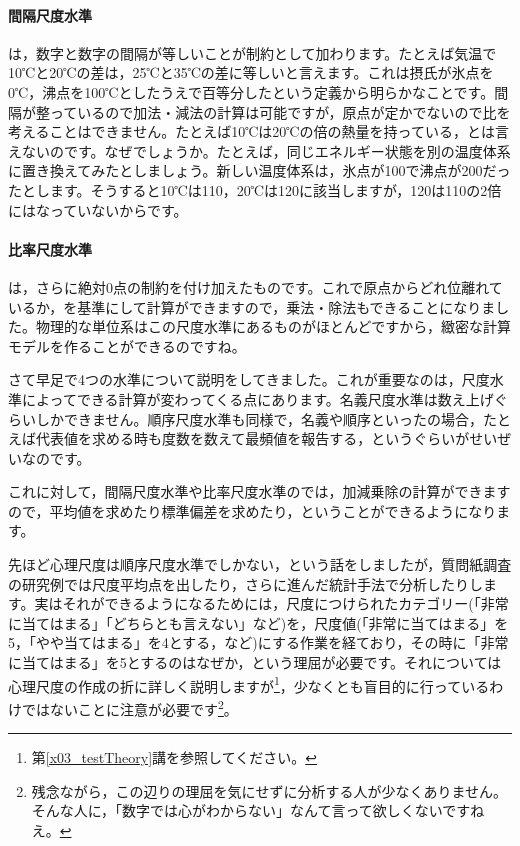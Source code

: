 \documentclass{ltjsbook}
\begin{document}
\paragraph{間隔尺度水準} は，数字と数字の間隔が等しいことが制約として加わります。たとえば気温で10℃と20℃の差は，25℃と35℃の差に等しいと言えます。これは摂氏が氷点を0℃，沸点を100℃としたうえで百等分したという定義から明らかなことです。間隔が整っているので加法・減法の計算は可能ですが，原点が定かでないので比を考えることはできません。たとえば10℃は20℃の倍の熱量を持っている，とは言えないのです。なぜでしょうか。たとえば，同じエネルギー状態を別の温度体系に置き換えてみたとしましょう。新しい温度体系は，氷点が100で沸点が200だったとします。そうすると10℃は110，20℃は120に該当しますが，120は110の2倍にはなっていないからです。

\paragraph{比率尺度水準}  は，さらに絶対0点の制約を付け加えたものです。これで原点からどれ位離れているか，を基準にして計算ができますので，乗法・除法もできることになりました。物理的な単位系はこの尺度水準にあるものがほとんどですから，緻密な計算モデルを作ることができるのですね。

さて早足で4つの水準について説明をしてきました。これが重要なのは，尺度水準によってできる計算が変わってくる点にあります。名義尺度水準は数え上げぐらいしかできません。順序尺度水準も同様で，名義や順序といったの場合，たとえば代表値を求める時も度数を数えて最頻値を報告する，というぐらいがせいぜいなのです。

これに対して，間隔尺度水準や比率尺度水準のでは，加減乗除の計算ができますので，平均値を求めたり標準偏差を求めたり，ということができるようになります。

先ほど心理尺度は順序尺度水準でしかない，という話をしましたが，質問紙調査の研究例では尺度平均点を出したり，さらに進んだ統計手法で分析したりします。実はそれができるようになるためには，尺度につけられたカテゴリー(「非常に当てはまる」「どちらとも言えない」など)を，尺度値(「非常に当てはまる」を5，「やや当てはまる」を4とする，など)にする作業を経ており，その時に「非常に当てはまる」を5とするのはなぜか，という理屈が必要です。それについては心理尺度の作成の折に詳しく説明しますが\footnote{第\ref{x03_testTheory}講を参照してください。}，少なくとも盲目的に行っているわけではないことに注意が必要です\footnote{残念ながら，この辺りの理屈を気にせずに分析する人が少なくありません。そんな人に，「数字では心がわからない」なんて言って欲しくないですねえ。}。
\end{document}
